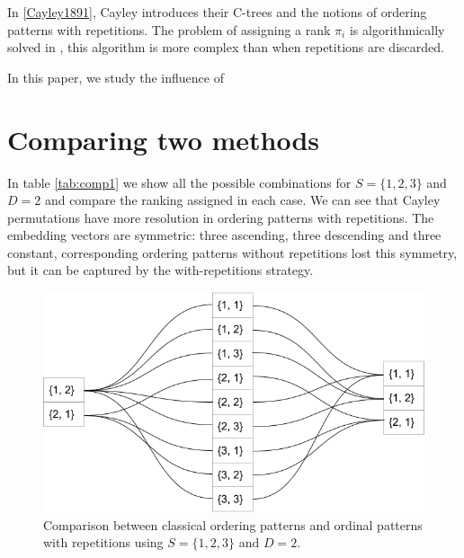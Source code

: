 \documentclass[twocolumn]{article}
\begin{document}
In \ref{Cayley1891}, Cayley introduces their C-trees and the notions of ordering patterns with repetitions. The problem of assigning a rank $\pi_i$ is algorithmically solved in \cite{algorithm306}, this algorithm is more complex than when repetitions are discarded.

In this paper, we study the influence of 


\section{Comparing two methods}

In table \ref{tab:comp1} we show all the possible combinations for $S = \{1, 2, 3\}$ and $D=2$ and compare the ranking assigned in each case. We can see that Cayley permutations have more resolution in ordering patterns with repetitions. The embedding vectors are symmetric: three ascending, three descending and three constant, corresponding ordering patterns without repetitions lost this symmetry, but it can be captured by the with-repetitions strategy.


\begin{figure}
    \centering
    \includegraphics[width=.5\textwidth]{comp_N3_D2.png}
    \caption{Comparison between classical ordering patterns and ordinal patterns with repetitions using $S = \{1, 2, 3\}$ and $D=2$.}
    \label{fig:my_label}
\end{figure}
\end{document}
